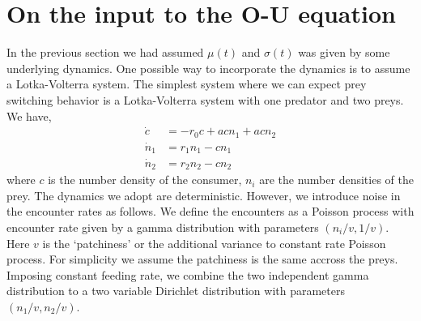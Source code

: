 \documentclass[12pt]{iopart}
\begin{document}
\section{On the input to the O-U equation}
In the previous section we had assumed $\mu(t)$ and $\sigma(t)$ was given by some underlying dynamics. One possible way to incorporate the dynamics is to assume a Lotka-Volterra system. The simplest system where we can expect prey switching behavior is a Lotka-Volterra system with one predator and two preys. We have,
\begin{align}
\label{Lotka-Volterra-system}
\dot{c} &= -r_0 c + a c n_1 + a c n_2 \nonumber \\
\dot{n}_1 &= r_1 n_1 - c n_1 \nonumber \\
\dot{n}_2 &= r_2 n_2 - c n_2 
\end{align}
where $c$ is the number density of the consumer, $n_i$ are the number densities of the prey. The dynamics we adopt are deterministic. However, we introduce noise in the encounter rates as follows. We define the encounters as a Poisson process with encounter rate given by a gamma distribution with parameters $(n_i/v, 1/v)$. Here $v$ is the `patchiness' or the additional variance to constant rate Poisson process. For simplicity we assume the patchiness is the same accross the preys. Imposing constant feeding rate, we combine the two independent gamma distribution to a two variable Dirichlet distribution with parameters $(n_1/v, n_2/v)$. 
\end{document}
